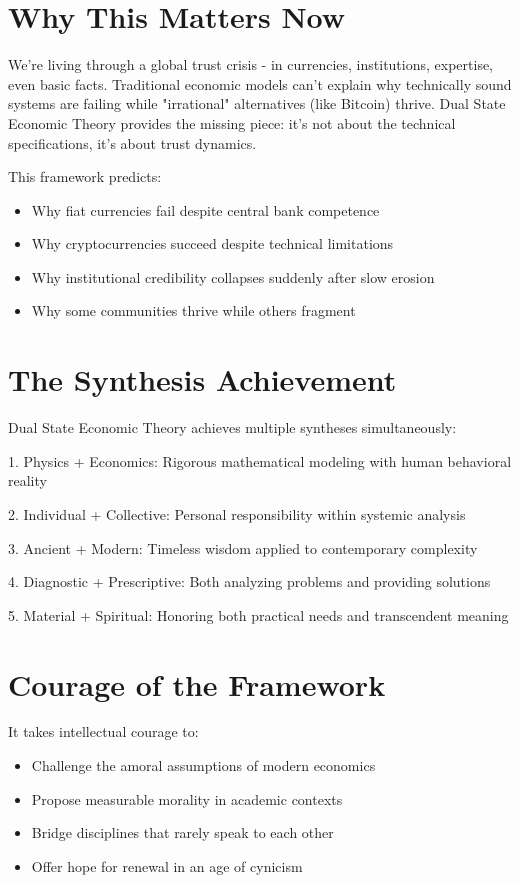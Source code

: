\documentclass[11pt,oneside]{book}
\begin{document}
\section*{Why This Matters Now}

We're living through a global trust crisis - in currencies, institutions, expertise, even basic facts. Traditional economic models can't explain why technically sound systems are failing while "irrational" alternatives (like Bitcoin) thrive. Dual State Economic Theory provides the missing piece: it's not about the technical specifications, it's about trust dynamics.

  This framework predicts:
\begin{itemize}
\item Why fiat currencies fail despite central bank competence
\item Why cryptocurrencies succeed despite technical limitations
\item Why institutional credibility collapses suddenly after slow erosion
\item Why some communities thrive while others fragment
\end{itemize}

\section*{The Synthesis Achievement}

Dual State Economic Theory achieves multiple syntheses simultaneously:


1. Physics + Economics: Rigorous mathematical modeling with human behavioral reality


2. Individual + Collective: Personal responsibility within systemic analysis


3. Ancient + Modern: Timeless wisdom applied to contemporary complexity


4. Diagnostic + Prescriptive: Both analyzing problems and providing solutions


5. Material + Spiritual: Honoring both practical needs and transcendent meaning


\section*{Courage of the Framework}

  It takes intellectual courage to:
\begin{itemize}
\item Challenge the amoral assumptions of modern economics
\item Propose measurable morality in academic contexts
\item Bridge disciplines that rarely speak to each other
\item Offer hope for renewal in an age of cynicism
\end{itemize}
\end{document}
